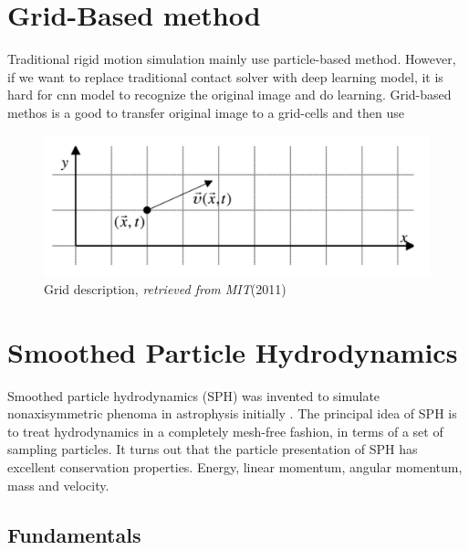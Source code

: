 \section{Grid-Based method}
    Traditional rigid motion simulation mainly use particle-based method. However, if we want to replace traditional contact solver with deep learning model, it is hard for cnn model to recognize the original image and do learning. Grid-based methos is a good to transfer original image to a grid-cells and then use

    \begin{figure}
        \centering
        \includegraphics[scale = 0.4]{Figures/grid_method.png}
        \caption{Grid description, \textit{retrieved from MIT}(2011)}
    \end{figure}

\section{Smoothed Particle Hydrodynamics}
    Smoothed particle hydrodynamics (SPH) was invented to simulate nonaxisymmetric phenoma in astrophysis initially \cite{DBLP:journals/corr/GuWKMSSLWW15}. The principal idea of SPH is to treat hydrodynamics in a completely mesh-free fashion, in terms of a set of sampling particles. It turns out that the particle presentation of SPH has excellent conservation properties. Energy, linear momentum, angular momentum, mass and velocity.

    \subsection{Fundamentals}

